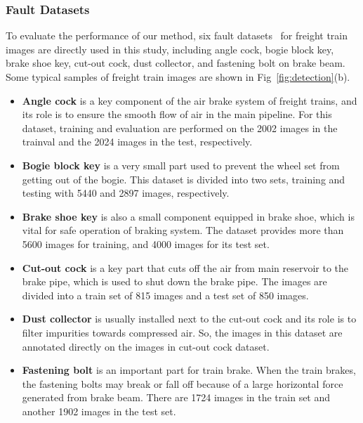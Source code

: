 \subsubsection{Fault Datasets} To evaluate the performance of our method, six fault datasets~\cite{zhang2018,8911418} for freight train images are directly used in this study, including angle cock, bogie block key, brake shoe key, cut-out cock, dust collector, and fastening bolt on brake beam. Some typical samples of freight train images are shown in Fig~\ref{fig:detection}(b).
\begin{itemize}
  \item \textbf{Angle cock} is a key component of the air brake system of freight trains, and its role is to ensure the smooth flow of air in the main pipeline. For this dataset, training and evaluation are performed on the 2002 images in the trainval and the 2024 images in the test, respectively.
  \item \textbf{Bogie block key} is a very small part used to prevent the wheel set from getting out of the bogie. This dataset is divided into two sets, training and testing with 5440 and 2897 images, respectively.
  \item \textbf{Brake shoe key} is also a small component equipped in brake shoe, which is vital for safe operation of braking system. The dataset provides more than 5600 images for training, and 4000 images for its test set.
  \item \textbf{Cut-out cock} is a key part that cuts off the air from main reservoir to the brake pipe, which is used to shut down the brake pipe. The images are divided into a train set of 815 images and a test set of 850 images.
  \item \textbf{Dust collector} is usually installed next to the cut-out cock and its role is to filter impurities towards compressed air. So, the images in this dataset are annotated directly on the images in cut-out cock dataset.
  \item\textbf{Fastening bolt} is an important part for train brake. When the train brakes, the fastening bolts may break or fall off because of a large horizontal force generated from brake beam. There are 1724 images in the train set and another 1902 images in the test set.
\end{itemize}

